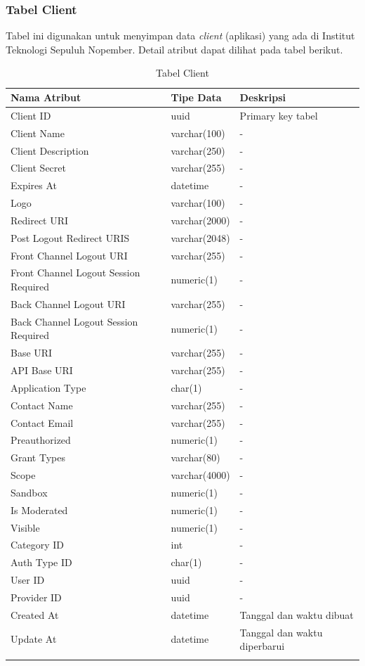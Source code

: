 \subsubsection{Tabel Client}
\par Tabel ini digunakan untuk menyimpan data \textit{client} (aplikasi) yang ada di Institut Teknologi Sepuluh Nopember. Detail atribut dapat dilihat pada tabel berikut.
\begin{longtable}{|p{2.5cm}|p{2cm}|p{4.5cm}|}
    \hline
    \textbf{Nama Atribut} & \textbf{Tipe Data} & \textbf{Deskripsi} \\ \hline
    Client ID & uuid & Primary key tabel \\ \hline
    Client Name & varchar(100) & - \\ \hline
    Client Description & varchar(250) & - \\ \hline
    Client Secret & varchar(255) & - \\ \hline
    Expires At & datetime & - \\ \hline
    Logo & varchar(100) & - \\ \hline
    Redirect URI & varchar(2000) & - \\ \hline
    Post Logout Redirect URIS & varchar(2048) & - \\ \hline
    Front Channel Logout URI & varchar(255) & - \\ \hline
    Front Channel Logout Session Required & numeric(1) & - \\ \hline
    Back Channel Logout URI & varchar(255) & - \\ \hline
    Back Channel Logout Session Required & numeric(1) & - \\ \hline
    Base URI & varchar(255) & - \\ \hline
    API Base URI & varchar(255) & - \\ \hline
    Application Type & char(1) & - \\ \hline
    Contact Name & varchar(255) & - \\ \hline
    Contact Email & varchar(255) & - \\ \hline
    Preauthorized & numeric(1) & - \\ \hline
    Grant Types & varchar(80) & - \\ \hline
    Scope & varchar(4000) & - \\ \hline
    Sandbox & numeric(1) & - \\ \hline
    Is Moderated & numeric(1) & - \\ \hline
    Visible & numeric(1) & - \\ \hline
    Category ID & int & - \\ \hline
    Auth Type ID & char(1) & - \\ \hline
    User ID & uuid & - \\ \hline
    Provider ID & uuid & - \\ \hline
    Created At & datetime & Tanggal dan waktu dibuat \\ \hline
    Update At & datetime & Tanggal dan waktu diperbarui \\ \hline
    \caption{Tabel Client}
\end{longtable}

